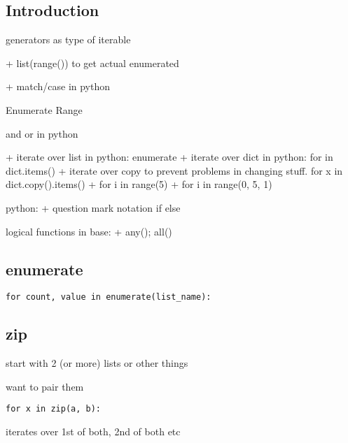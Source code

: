 
\subsection{Introduction}


generators as type of iterable

+ list(range()) to get actual enumerated

+ match/case in python

Enumerate
Range

and or in python

+ iterate over list in python: enumerate
+ iterate over dict in python: for in dict.items()
+ iterate over copy to prevent problems in changing stuff. for x in dict.copy().items()
+ for i in range(5)
+ for i in range(0, 5, 1)

python:
+ question mark notation if else


logical functions in base:
+ any(); all()


\subsection{enumerate}

\begin{verbatim}
for count, value in enumerate(list_name):
\end{verbatim}

\subsection{zip}

start with 2 (or more) lists or other things

want to pair them

\begin{verbatim}
for x in zip(a, b):
\end{verbatim}

iterates over 1st of both, 2nd of both etc

